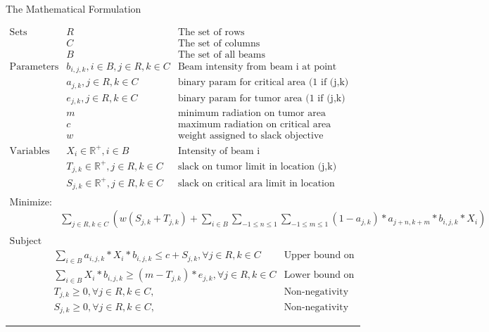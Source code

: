 \documentclass[12pt]{article}
\makeatletter
\newenvironment{task}{\@startsection
       {section}{1}
       {0.4em}{-.5ex plus -1ex minus -.2ex}{.5ex plus .2ex}
       {\pagebreak[3]\large\bf\noindent{Task}}}
       {\nopagebreak[3]\vspace{3ex}\begin{center}\rule{1\linewidth}{.3pt}\end{center}}
\makeatother
\begin{document}
\begin{task}{The Mathematical Formulation}
\begin{enumerate}
\begin{eqnarray*}  
 \textrm{Sets} &  R & \textrm{The set of rows} \\
			& C & \textrm{The set of columns}\\ 
			& B & \textrm{The set of all beams} \\
 \textrm{Parameters} & b_{i,j,k}, i \in B, j \in R, k \in C   & \textrm{Beam intensity from beam i at point (j,k)} \\
& a_{j,k}, j \in R, k \in C   & \textrm{binary param for critical area (1 if (j,k) in critical area)} \\ 
& e_{j,k}, j \in R, k \in C   & \textrm{binary param for tumor area (1 if (j,k) in tumor area)} \\ 
& m & \textrm{minimum radiation on tumor area} \\
& c & \textrm{maximum radiation on critical area} \\
& w & \textrm{weight assigned to slack objective} \\
\textrm{Variables} 
& X_{i} \in \mathbb{R}^+, i \in B & \textrm{Intensity of beam i} \\
& T_{j,k} \in \mathbb{R}^+, j \in R, k \in C & \textrm{slack on tumor limit in location (j,k)} \\
& S_{j,k} \in \mathbb{R}^+, j \in R, k \in C & \textrm{slack on critical ara limit in location (j,k)} \\
\end{eqnarray*}
\begin{eqnarray*} 
\textrm{Minimize:} \\
& \sum_{j \in R, k \in C} (w(S_{j,k} + T_{j,k}) + \sum_{i \in B} \sum_{-1 \leq n \leq 1} \sum_{-1 \leq m \leq 1} (1-a_{j,k}) * a_{j+n, k+m} * b_{i,j,k} * X_{i})\\ 
\end{eqnarray*}
\begin{eqnarray*}
\textrm{Subject to:}\\
& \sum_{i \in B} a_{i,j,k} * X_{i} * b_{i,j,k} \leq c + S_{j,k}, \forall j \in R, k \in C & \textrm {Upper bound on C.A. radiation} \\
& \sum_{i \in B} X_{i} * b_{i,j,k} \geq (m - T_{j,k}) * e_{j,k}, \forall j \in R, k \in C & \textrm {Lower bound on tumor radiation} \\
& T_{j,k} \geq 0, \forall j \in R, k \in C, & \textrm{Non-negativity slack constraint}  \\
& S_{j,k} \geq 0, \forall j \in R, k \in C, & \textrm{Non-negativity slack constraint} 
\end{eqnarray*}
\end{enumerate}
\end{task}
\end{document}
